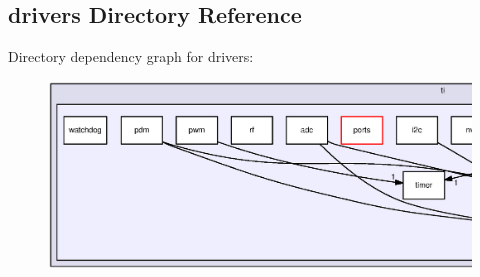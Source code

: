 \subsection{drivers Directory Reference}
\label{dir_0cb81fd6c85f019880acb70b2ad7d838}
Directory dependency graph for drivers\+:
\nopagebreak
\begin{figure}[H]
\begin{center}
\leavevmode
\includegraphics[width=350pt]{dir_0cb81fd6c85f019880acb70b2ad7d838_dep}
\end{center}
\end{figure}
